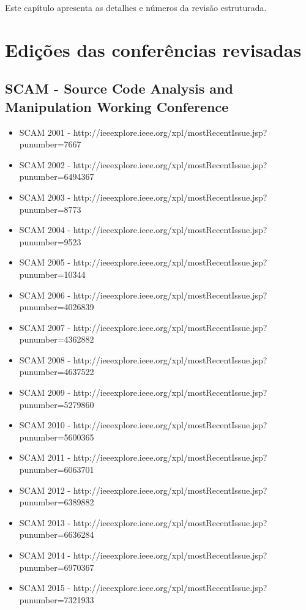 {Este capítulo apresenta as detalhes e números da revisão estruturada.}
\label{apendice-revisao-estruturada}

\section{Edições das conferências revisadas}
\label{edicoes-conferencias}

\subsection{SCAM - Source Code Analysis and Manipulation Working Conference}

\begin{itemize}
  \item SCAM 2001 - {\small http://ieeexplore.ieee.org/xpl/mostRecentIssue.jsp?punumber=7667}
  \item SCAM 2002 - {\small http://ieeexplore.ieee.org/xpl/mostRecentIssue.jsp?punumber=6494367}
  \item SCAM 2003 - {\small http://ieeexplore.ieee.org/xpl/mostRecentIssue.jsp?punumber=8773}
  \item SCAM 2004 - {\small http://ieeexplore.ieee.org/xpl/mostRecentIssue.jsp?punumber=9523}
  \item SCAM 2005 - {\small http://ieeexplore.ieee.org/xpl/mostRecentIssue.jsp?punumber=10344}
  \item SCAM 2006 - {\small http://ieeexplore.ieee.org/xpl/mostRecentIssue.jsp?punumber=4026839}
  \item SCAM 2007 - {\small http://ieeexplore.ieee.org/xpl/mostRecentIssue.jsp?punumber=4362882}
  \item SCAM 2008 - {\small http://ieeexplore.ieee.org/xpl/mostRecentIssue.jsp?punumber=4637522}
  \item SCAM 2009 - {\small http://ieeexplore.ieee.org/xpl/mostRecentIssue.jsp?punumber=5279860}
  \item SCAM 2010 - {\small http://ieeexplore.ieee.org/xpl/mostRecentIssue.jsp?punumber=5600365}
  \item SCAM 2011 - {\small http://ieeexplore.ieee.org/xpl/mostRecentIssue.jsp?punumber=6063701}
  \item SCAM 2012 - {\small http://ieeexplore.ieee.org/xpl/mostRecentIssue.jsp?punumber=6389882}
  \item SCAM 2013 - {\small http://ieeexplore.ieee.org/xpl/mostRecentIssue.jsp?punumber=6636284}
  \item SCAM 2014 - {\small http://ieeexplore.ieee.org/xpl/mostRecentIssue.jsp?punumber=6970367}
  \item SCAM 2015 - {\small http://ieeexplore.ieee.org/xpl/mostRecentIssue.jsp?punumber=7321933}
\end{itemize}


